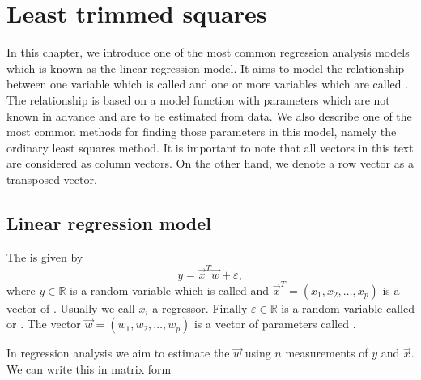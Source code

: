 
\chapter{Least trimmed squares}
In this chapter, we introduce one of the most common regression analysis models which is known as the linear regression model. It aims to model the relationship between one variable which is called  and one or more variables which are called . The relationship is based on a model function with parameters which are not known in advance and are to be estimated from data. We also describe one of the most common methods for finding those parameters in this model, namely the ordinary least squares method. It is important to note that all vectors in this text are considered as column vectors. On the other hand, we denote a row vector as a transposed vector.




\section{Linear regression model}
\begin{definition}\label{definition:lr_model}
    The  is given by
\begin{equation}
        y = \vec{x}^T\vec{w} + \varepsilon ,
\end{equation}
where $y \in \mathbb{R}$ is a random variable which is called  and $\vec{x}^T = (x_1, x_2, \ldots, x_p)$ is a vector of . Usually we call $x_i$ a regressor. Finally $\varepsilon \in \mathbb{R}$ is a random variable called  or . The vector $\vec{w} = (w_1, w_2, \ldots, w_p)$ is a vector of parameters called  . 
\end{definition}
In regression analysis we aim to estimate the $\vec{w}$ using $n$ measurements of $y$ and $\vec{x}$. We can write this in matrix form 


